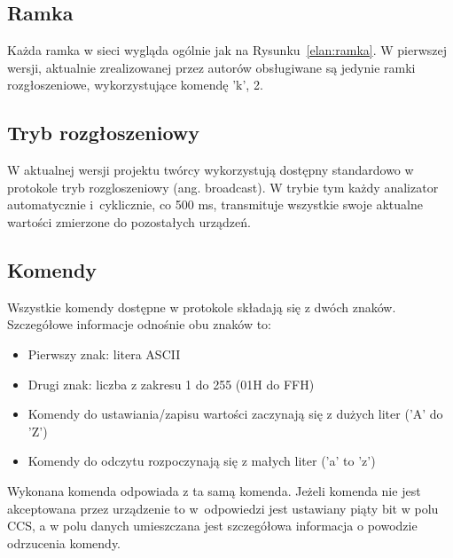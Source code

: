 
\subsection{Ramka}
Każda ramka w sieci wygląda ogólnie jak na Rysunku~\ref{elan:ramka}. W pierwszej wersji, aktualnie zrealizowanej przez autorów obsługiwane są jedynie ramki rozgłoszeniowe, wykorzystujące komendę 'k', 2.

\subsection{Tryb rozgłoszeniowy}
W aktualnej wersji projektu twórcy wykorzystują dostępny standardowo w protokole tryb rozgloszeniowy (ang. broadcast). W trybie tym każdy analizator automatycznie i~cyklicznie, co 500 ms, transmituje wszystkie swoje aktualne wartości zmierzone do pozostałych urządzeń.

\subsection{Komendy}
Wszystkie komendy dostępne w protokole składają się z dwóch znaków. Szczegółowe informacje odnośnie obu znaków to:
\begin{itemize}
\item Pierwszy znak: litera ASCII
\item Drugi znak: liczba z zakresu 1 do 255 (01H do FFH)
\item Komendy do ustawiania/zapisu wartości zaczynają się z dużych liter ('A' do 'Z')
\item Komendy do odczytu rozpoczynają się z małych liter ('a' to 'z')
\end{itemize}
Wykonana komenda odpowiada z ta samą komenda. Jeżeli komenda nie jest akceptowana przez urządzenie to w~odpowiedzi jest ustawiany piąty bit w polu CCS, a w polu danych umieszczana jest szczegółowa informacja o powodzie odrzucenia komendy.
